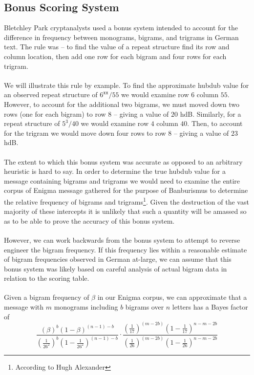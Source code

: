 \subsection{Bonus Scoring System} Bletchley Park cryptanalysts used
a bonus system intended to account for the difference in frequency
between monograms, bigrams, and trigrams in German text. The rule
was -- to find the value of a repeat structure find its row and
column location, then add one row for each bigram and four rows for
each trigram. \\\\We will illustrate this rule by example. To find
the approximate hubdub value for an observed repeat structure of
$6^\texttt{xx}/55$ we would examine row $6$ column $55$. However,
to account for the additional two bigrams, we must moved down two
rows (one for each bigram) to row $8$ -- giving a value of $20$
hdB. Similarly, for a repeat structure of $5^3/40$ we would examine
row $4$ column $40$. Then, to account for the trigram we would move
down four rows to row $8$ -- giving a value of $23$ hdB.
\\\\The extent to which this bonus system was accurate as opposed
to an arbitrary heuristic is hard to say. In order to determine the
true hubdub value for a message containing bigrams and trigrams we
would need to examine the entire corpus of Enigma message gathered
for the purpose of Banburismus to determine the relative frequency
of bigrams and trigrams\footnote{According to Hugh Alexander}.
Given the destruction of the vast majority of these intercepts it
is unlikely that such a quantity will be amassed so as to be able
to prove the accuracy of this bonus system.
\\\\However, we can work backwards from the bonus system to attempt
to reverse engineer the bigram frequency. If this frequency lies
within a reasonable estimate of bigram frequencies observed in
German at-large, we can assume that this bonus system was likely
based on careful analysis of actual bigram data in relation to the
scoring table.
\\\\Given a bigram frequency of $\beta$ in our Enigma corpus, we
can approximate that a message with $m$ monograms including $b$
bigrams over $n$ letters has a Bayes factor of
\[
	\frac{(\beta)^b(1-\beta)^{(n-1)-b}}{(\frac{1}{26^2})^b(1-\frac{1}{26^2})^{(n-1)-b}}\cdot\frac{(\frac{1}{17})^{(m-2b)}(1-\frac{1}{17})^{n-m-2b}}{(\frac{1}{26})^{(m-2b)}(1-\frac{1}{26})^{n-m-2b}}
\]
